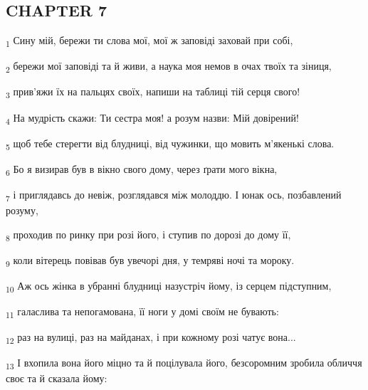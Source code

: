 \subsection{CHAPTER 7}
\begin{tcolorbox}
\textsubscript{1} Сину мій, бережи ти слова мої, мої ж заповіді заховай при собі,
\end{tcolorbox}
\begin{tcolorbox}
\textsubscript{2} бережи мої заповіді та й живи, а наука моя немов в очах твоїх та зіниця,
\end{tcolorbox}
\begin{tcolorbox}
\textsubscript{3} прив'яжи їх на пальцях своїх, напиши на таблиці тій серця свого!
\end{tcolorbox}
\begin{tcolorbox}
\textsubscript{4} На мудрість скажи: Ти сестра моя! а розум назви: Мій довірений!
\end{tcolorbox}
\begin{tcolorbox}
\textsubscript{5} щоб тебе стерегти від блудниці, від чужинки, що мовить м'якенькі слова.
\end{tcolorbox}
\begin{tcolorbox}
\textsubscript{6} Бо я визирав був в вікно свого дому, через ґрати мого вікна,
\end{tcolorbox}
\begin{tcolorbox}
\textsubscript{7} і приглядавсь до невіж, розглядався між молоддю. І юнак ось, позбавлений розуму,
\end{tcolorbox}
\begin{tcolorbox}
\textsubscript{8} проходив по ринку при розі його, і ступив по дорозі до дому її,
\end{tcolorbox}
\begin{tcolorbox}
\textsubscript{9} коли вітерець повівав був увечорі дня, у темряві ночі та мороку.
\end{tcolorbox}
\begin{tcolorbox}
\textsubscript{10} Аж ось жінка в убранні блудниці назустріч йому, із серцем підступним,
\end{tcolorbox}
\begin{tcolorbox}
\textsubscript{11} галаслива та непогамована, її ноги у домі своїм не бувають:
\end{tcolorbox}
\begin{tcolorbox}
\textsubscript{12} раз на вулиці, раз на майданах, і при кожному розі чатує вона...
\end{tcolorbox}
\begin{tcolorbox}
\textsubscript{13} І вхопила вона його міцно та й поцілувала його, безсоромним зробила обличчя своє та й сказала йому:
\end{tcolorbox}
